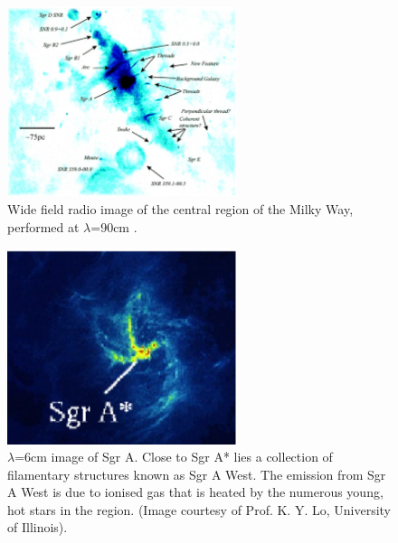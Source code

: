 \begin{figure}[p]
	\begin{center}
	\includegraphics[angle=0,width=0.6\textwidth]{eps/radio.eps}
	\caption{Wide field radio image of the central region of the Milky Way, performed at $\lambda$=90cm \cite{ref_radiopic}.}
	\label{fig_radio}
	\end{center}
\end{figure}
\begin{figure}[p]
	\begin{center}
	\includegraphics[angle=0,width=0.6\textwidth]{eps/sgrawest.eps}
	\caption{$\lambda$=6cm image of Sgr A. Close to Sgr A* lies a collection of filamentary structures known as Sgr A West.
	The emission from Sgr A West is due to ionised gas that is heated by the numerous young, hot stars in the region.
	(Image courtesy of Prof. K. Y. Lo, University of Illinois).}
	\label{fig_sgrawest}
	\end{center}
\end{figure}
